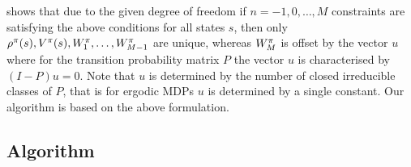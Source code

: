 \documentclass[envcountsame]{llncs}
\begin{document}
\citet[p.343ff]{Puterman94} shows that due to the given degree of freedom if \(n=-1,0,\ldots,M\)
constraints are satisfying the above conditions for all states \(s\), then only
\(\rho^{\pi}(s), V^{\pi}(s), W^{\pi}_{1}, \ldots, W^{\pi}_{M-1}\) are unique, whereas
\(W^{\pi}_{M}\) is offset by the vector \(u\) where for the transition probability matrix \(P\) the
vector \(u\) is characterised by \((I-P)u = 0\). Note that \(u\) is determined by the number of
closed irreducible classes of \(P\), that is for ergodic MDPs \(u\) is determined by a single
constant. Our algorithm is based on the above formulation.

\subsection{Algorithm}
\label{subsec:Algorithm}
\end{document}
